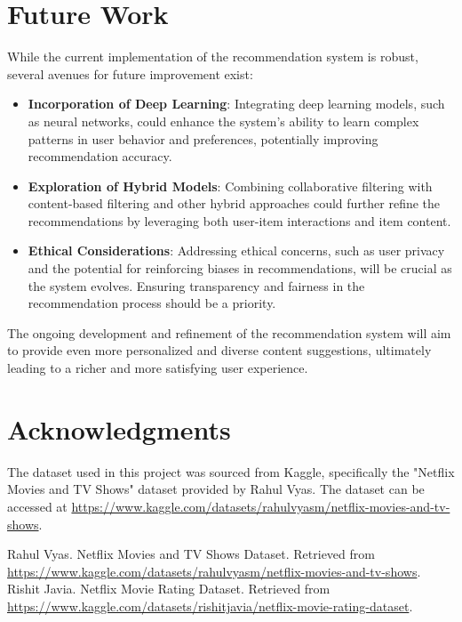 \documentclass[sigconf]{acmart}
\begin{document}
	\section{Future Work}
	While the current implementation of the recommendation system is robust, several avenues for future improvement exist:
	\begin{itemize}
		\item \textbf{Incorporation of Deep Learning}: Integrating deep learning models, such as neural networks, could enhance the system's ability to learn complex patterns in user behavior and preferences, potentially improving recommendation accuracy.
		\item \textbf{Exploration of Hybrid Models}: Combining collaborative filtering with content-based filtering and other hybrid approaches could further refine the recommendations by leveraging both user-item interactions and item content.
		\item \textbf{Ethical Considerations}: Addressing ethical concerns, such as user privacy and the potential for reinforcing biases in recommendations, will be crucial as the system evolves. Ensuring transparency and fairness in the recommendation process should be a priority.
	\end{itemize}
	The ongoing development and refinement of the recommendation system will aim to provide even more personalized and diverse content suggestions, ultimately leading to a richer and more satisfying user experience.
	\section*{Acknowledgments}
	The dataset used in this project was sourced from Kaggle, specifically the "Netflix Movies and TV Shows" dataset provided by Rahul Vyas. The dataset can be accessed at \url{https://www.kaggle.com/datasets/rahulvyasm/netflix-movies-and-tv-shows}.
	
	
	\begin{thebibliography}{00}
		 Rahul Vyas. Netflix Movies and TV Shows Dataset. Retrieved from \url{https://www.kaggle.com/datasets/rahulvyasm/netflix-movies-and-tv-shows}.
		 Rishit Javia. Netflix Movie Rating Dataset. Retrieved from \url{https://www.kaggle.com/datasets/rishitjavia/netflix-movie-rating-dataset}.
	\end{thebibliography}
	
\end{document}
